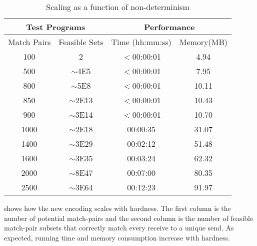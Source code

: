 \begin{table}
\begin{center}
\scriptsize
\caption{Scaling as a function of non-determinism}
\begin{tabular}{|c|c|c|c|}
		\hline
         \multicolumn{2}{|c|}{Test Programs} & \multicolumn{2}{|c|}{Performance} \\ \hline
          Match Pairs & Feasible Sets &  Time (hh:mm:ss) & Memory(MB) \\ \hline
100 &          2      &    $<$00:00:01    &     4.94 \\
500 &       $\sim$4E5 &    $<$00:00:01    &     7.95 \\
800 &       $\sim$5E8 &    $<$00:00:01    &        10.11 \\
850 &       $\sim$2E13 &    $<$00:00:01   &      10.43 \\
900 &       $\sim$3E14 &    $<$00:00:01   &      10.70 \\
1000 &      $\sim$2E18  &   00:00:35       &     31.07 \\
1400 &      $\sim$3E29  &   00:02:12       &     51.48 \\
1600 &     $\sim$3E35   &  00:03:24        &    62.32 \\
2000 &     $\sim$8E47   &  00:07:00        &    80.35 \\
2500 &     $\sim$3E64   &  00:12:23        &    91.97 \\
         \hline
		\end{tabular}
\end{center}
\label{table:first}
\end{table}

 shows how the new encoding scales with hardness. The first column is the number of potential match-pairs and the second column is the number of feasible match-pair subsets that correctly match every receive to a unique send. As expected, running time and memory consumption increase with hardness.

